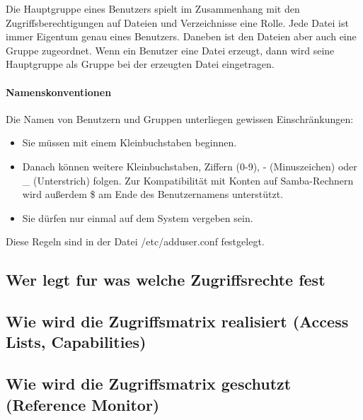 \documentclass{scrartcl}
\begin{document}
Die Hauptgruppe eines Benutzers spielt im Zusammenhang mit den
Zugriffsberechtigungen auf Dateien und Verzeichnisse eine Rolle. Jede Datei ist
immer Eigentum genau eines Benutzers. Daneben ist den Dateien aber auch eine
Gruppe zugeordnet. Wenn ein Benutzer eine Datei erzeugt, dann wird seine
Hauptgruppe als Gruppe bei der erzeugten Datei eingetragen.


\paragraph{Namenskonventionen}
Die Namen von Benutzern und Gruppen unterliegen gewissen Einschränkungen:
\begin{itemize}
  \item Sie müssen mit einem Kleinbuchstaben beginnen.
  \item Danach können weitere Kleinbuchstaben, Ziffern (0-9), - (Minuszeichen)
    oder _ (Unterstrich) folgen. Zur Kompatibilität mit Konten auf
    Samba-Rechnern wird außerdem \$ am Ende des Benutzernamens unterstützt.
  \item Sie dürfen nur einmal auf dem System vergeben sein.
\end{itemize}
Diese Regeln sind in der Datei /etc/adduser.conf festgelegt.

\subsection*{Wer legt fur was welche Zugriffsrechte fest}
\subsection*{Wie wird die Zugriffsmatrix realisiert (Access Lists, Capabilities)}
\subsection*{Wie wird die Zugriffsmatrix geschutzt (Reference Monitor)}
\end{document}
